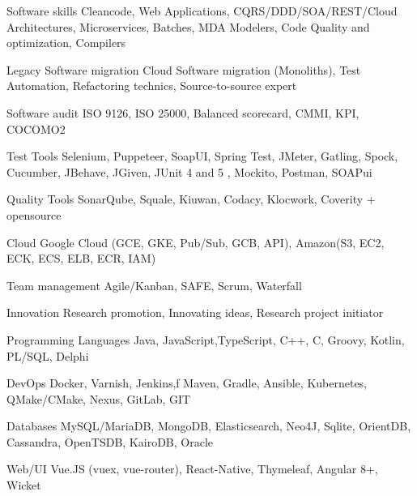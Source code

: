 

\begin{cvskills}

  \cvskill
  {Software skills} %
  {Cleancode, Web Applications, CQRS/DDD/SOA/REST/Cloud Architectures, Microservices, Batches, MDA Modelers, Code Quality and optimization, Compilers} %


  \cvskill
  {Legacy Software migration} %
  {Cloud Software migration (Monoliths), Test Automation, Refactoring technics, Source-to-source expert} %


  \cvskill
  {Software audit} %
  {ISO 9126, ISO 25000, Balanced scorecard, CMMI, KPI, COCOMO2} %

  \cvskill
  {Test Tools} %
  {Selenium, Puppeteer, SoapUI, Spring Test, JMeter, Gatling, Spock, Cucumber, JBehave, JGiven, JUnit 4 and 5 , Mockito, Postman, SOAPui} %

  \cvskill
  {Quality Tools} %
  {SonarQube, Squale, Kiuwan, Codacy, Klocwork, Coverity + opensource} %


  \cvskill
  {Cloud} %
  {Google Cloud (GCE, GKE, Pub/Sub, GCB, API), Amazon(S3, EC2, ECK, ECS, ELB, ECR, IAM)} %


  \cvskill
  {Team management} %
  {Agile/Kanban, SAFE, Scrum, Waterfall} %

  \cvskill
  {Innovation} %
  {Research promotion, Innovating ideas, Research project initiator} %

  \cvskill
  {Programming Languages} %
  {Java, JavaScript,TypeScript, C++, C, Groovy, Kotlin, PL/SQL, Delphi} %
  
  \cvskill
  {DevOps} %
  {Docker, Varnish, Jenkins,f Maven, Gradle, Ansible, Kubernetes, QMake/CMake, Nexus, GitLab, GIT} %
  
  \cvskill
  {Databases} %
  {MySQL/MariaDB, MongoDB, Elasticsearch, Neo4J, Sqlite, OrientDB, Cassandra, OpenTSDB, KairoDB, Oracle} %
  
  \cvskill
  {Web/UI} %
  {Vue.JS (vuex, vue-router), React-Native, Thymeleaf, Angular 8+, Wicket} %
  

\end{cvskills}
